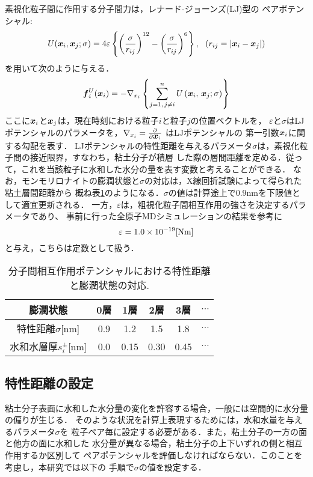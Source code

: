 素視化粒子間に作用する分子間力は，レナード-ジョーンズ(LJ)型の
ペアポテンシャル:
\begin{equation}
	U(\mbox{\boldmath $x$}_i,\mbox{\boldmath $x$}_j; \sigma) 
	= 4 \varepsilon 
	\left\{ 
	\left(\frac{\sigma}{r_{ij}}\right)^{12}
	-
	\left(\frac{\sigma}{r_{ij}}\right)^6
	\right\}, \ \ \left( r_{ij}=\left| \mbox{\boldmath $x$}_i-\mbox{\boldmath $x$}_j\right| \right)
	\label{eqn:LJ}
\end{equation}
を用いて次のように与える．
\begin{equation}
	\mbox{\boldmath $f$}_i^U(\mbox{\boldmath $x$}_i)
	=
	-\nabla_{x_i} 
	\left\{ 
		\sum_{j=1, \, j \neq i}^n U\left(\mbox{\boldmath $x$}_i,\,\mbox{\boldmath $x$}_j; \sigma \right)
	\right\}
	\label{eqn:fiU}
\end{equation}
ここに$\mbox{\boldmath $x$}_i$と$\mbox{\boldmath $x$}_j$は，現在時刻における粒子$i$と粒子$j$の位置ベクトルを，
$\varepsilon$と$\sigma$はLJポテンシャルのパラメータを，$\nabla_{x_i}=\frac{\partial}{\partial \mbox{\boldmath $x$}_i}$
はLJポテンシャルの 第一引数$\mbox{\boldmath $x$}_i$に関する勾配を表す．
LJポテンシャルの特性距離を与えるパラメータ$\sigma$は，素視化粒子間の接近限界，すなわち，粘土分子が積層
した際の層間距離を定める．従って，これを当該粒子に水和した水分の量を表す変数と考えることができる．
なお，モンモリロナイトの膨潤状態と$\sigma$の対応は，X線回折試験によって得られた粘土層間距離から
概ね表\ref{tbl:tbl_sig}のようになる．$\sigma$の値は計算途上で$0.9$nmを下限値として適宜更新される．
一方，$\varepsilon$は，粗視化粒子間相互作用の強さを決定するパラメータであり、
事前に行った全原子MDシミュレーションの結果を参考に
\begin{equation}
	\varepsilon=1.0\times 10^{-19}[{\rm Nm}]
	\label{eqn:LJ_eps}
\end{equation}
と与え，こちらは定数として扱う．
\begin{table}[h]
	\begin{center}
	\caption{分子間相互作用ポテンシャルにおける特性距離と膨潤状態の対応.}
	\vspace{3mm}
	\begin{tabular}{c||c|c|c|c|c}
		膨潤状態 & 0層 & 1層 & 2層 & 3層 & $\cdots$\\
		\hline
		特性距離$\sigma$[{\rm nm}]& 0.9 & 1.2 & 1.5 & 1.8 & $\cdots$ \\
		\hline
		水和水層厚$s^\pm_i$[{\rm nm}] & 0.0 & 0.15 & 0.30 & 0.45 & $\cdots$
	\end{tabular}
	\label{tbl:tbl_sig}
	\end{center}
\end{table}
\subsection{特性距離の設定}
粘土分子表面に水和した水分量の変化を許容する場合，一般には空間的に水分量の偏りが生じる．
そのような状況を計算上表現するためには，水和水量を与えるパラメータ$\sigma$を
粒子ペア毎に設定する必要がある．また，粘土分子の一方の面と他方の面に水和した
水分量が異なる場合，粘土分子の上下いずれの側と相互作用するか区別して
ペアポテンシャルを評価しなければならない．このことを考慮し，本研究では以下の
手順で$\sigma$の値を設定する．

